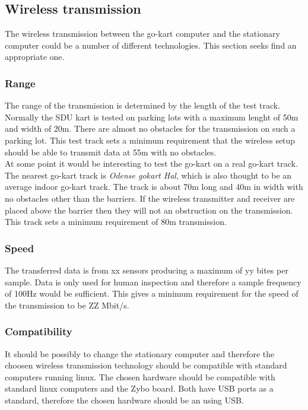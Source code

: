 
\subsection{Wireless transmission}
The wireless transmission between the go-kart computer and the stationary computer could be a number of different technologies.
This section seeks find an appropriate one.

\subsubsection{Range}
The range of the transmission is determined by the length of the test track. 
Normally the SDU kart is tested on parking lots with a maximum lenght of 50m and width of 20m.
There are almost no obstacles for the transmission on such a parking lot. 
This test track sets a minimum requirement that the wireless setup should be able to transmit data at 55m with no obstacles.
\\
At some point it would be interesting to test the go-kart on a real go-kart track. 
The nearest go-kart track is \textit{Odense gokart Hal}, which is also thought to be an average indoor go-kart track.
The track is about 70m long and 40m in width with no obstacles other than the barriers. 
If the wireless transmitter and receiver are placed above the barrier then they will not an obstruction on the transmission. 
This track sets a minimum requirement of 80m transmission. 

\subsubsection{Speed}
The transferred data is from xx sensors producing a maximum of yy bites per sample. 
Data is only used for human inspection and therefore a sample frequency of 100Hz would be sufficient.
This gives a minimum requirement for the speed of the transmission to be ZZ Mbit/s. 

\subsubsection{Compatibility}
It should be possibly to change the stationary computer and therefore the choosen wireless transmission technology should be compatible with standard computers running linux.
The chosen hardware should be compatible with standard linux computers and the Zybo board. 
Both have USB ports as a standard, therefore the chosen hardware should be an using USB.

